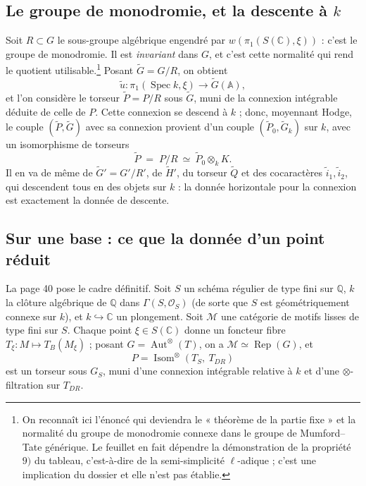 \documentclass[11pt,a4paper]{article}
\begin{document}
\subsection*{Le groupe de monodromie, et la descente à $k$}

Soit $R \subset G$ le sous-groupe algébrique engendré par
$w(\pi_{1}(S(\mathbb{C}), \xi))$ : c'est le groupe de monodromie. Il est
\emph{invariant} dans $G$, et c'est cette normalité qui rend le quotient
utilisable.\footnote{On reconnaît ici l'énoncé qui deviendra le « théorème de la
partie fixe » et la normalité du groupe de monodromie connexe dans le groupe de
Mumford--Tate générique. Le feuillet en fait dépendre la démonstration de la
propriété $9)$ du tableau, c'est-à-dire de la semi-simplicité $\ell$-adique ;
c'est une implication du dossier et elle n'est pas établie.} Posant
$\widetilde{G} = G/R$, on obtient
\[
\widetilde{u} : \pi_{1}(\operatorname{Spec} k, \xi) \longrightarrow \widetilde{G}(\mathbb{A}) ,
\]
et l'on considère le torseur $\widetilde{P} = P/R$ sous $\widetilde{G}$, muni de
la connexion intégrable déduite de celle de $P$. Cette connexion se descend à
$k$ ; donc, moyennant Hodge, le couple $(\widetilde{P}, \widetilde{G})$ avec sa
connexion provient d'un couple $(\widetilde{P}_{0}, \widetilde{G}_{k})$ sur $k$,
avec un isomorphisme de torseurs
\[
\widetilde{P} \;=\; P/R \ \simeq\ \widetilde{P}_{0} \otimes_{k} K .
\]
Il en va de même de $\widetilde{G}' = G'/R'$, de $\widetilde{H}'$, du torseur
$\widetilde{Q}$ et des cocaractères $\widetilde{i}_{1}, \widetilde{i}_{2}$, qui
descendent tous en des objets sur $k$ : la donnée horizontale pour la connexion
est exactement la donnée de descente.

\subsection*{Sur une base : ce que la donnée d'un point réduit}

La page 40 pose le cadre définitif. Soit $S$ un schéma régulier de type fini sur
$\mathbb{Q}$, $k$ la clôture algébrique de $\mathbb{Q}$ dans
$\Gamma(S, \mathcal{O}_{S})$ (de sorte que $S$ est géométriquement connexe
sur $k$), et $k \hookrightarrow \mathbb{C}$ un plongement. Soit $\mathcal{M}$
une catégorie de motifs lisses de type fini sur $S$. Chaque point
$\xi \in S(\mathbb{C})$ donne un foncteur fibre $T_{\xi} : M \mapsto
T_{B}(M_{\xi})$ ; posant $G = \operatorname{Aut}^{\otimes}(T)$, on a
$\mathcal{M} \simeq \operatorname{Rep}(G)$, et
\[
P = \operatorname{Isom}^{\otimes}(T_{S},\ T_{DR})
\]
est un torseur sous $G_{S}$, muni d'une connexion intégrable relative à $k$ et
d'une $\otimes$-filtration sur $T_{DR}$.
\end{document}
